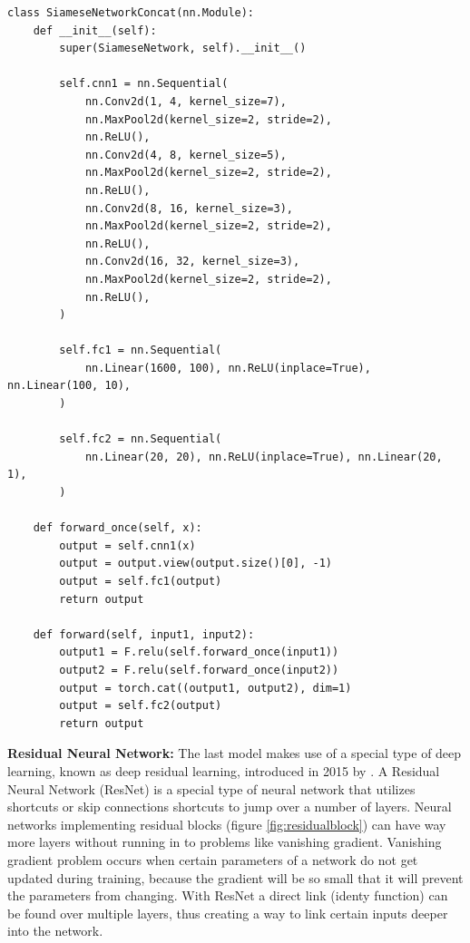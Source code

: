  \begin{lstlisting}[caption={Code for CNN with Cross Entropy Loss}, label={lst:cnncel}, frame=single, breaklines=true]
 class SiameseNetworkConcat(nn.Module):
    def __init__(self):
        super(SiameseNetwork, self).__init__()

        self.cnn1 = nn.Sequential(
            nn.Conv2d(1, 4, kernel_size=7),
            nn.MaxPool2d(kernel_size=2, stride=2),
            nn.ReLU(),
            nn.Conv2d(4, 8, kernel_size=5),
            nn.MaxPool2d(kernel_size=2, stride=2),
            nn.ReLU(),
            nn.Conv2d(8, 16, kernel_size=3),
            nn.MaxPool2d(kernel_size=2, stride=2),
            nn.ReLU(),
            nn.Conv2d(16, 32, kernel_size=3),
            nn.MaxPool2d(kernel_size=2, stride=2),
            nn.ReLU(),
        )

        self.fc1 = nn.Sequential(
            nn.Linear(1600, 100), nn.ReLU(inplace=True), nn.Linear(100, 10),
        )

        self.fc2 = nn.Sequential(
            nn.Linear(20, 20), nn.ReLU(inplace=True), nn.Linear(20, 1),
        )

    def forward_once(self, x):
        output = self.cnn1(x)
        output = output.view(output.size()[0], -1)
        output = self.fc1(output)
        return output

    def forward(self, input1, input2):
        output1 = F.relu(self.forward_once(input1))
        output2 = F.relu(self.forward_once(input2))
        output = torch.cat((output1, output2), dim=1)
        output = self.fc2(output)
        return output
 \end{lstlisting}

\textbf{Residual Neural Network:} The last model makes use of a special type of deep learning, known as deep residual learning, introduced in 2015 by \cite{he2016deep}. A Residual Neural Network (ResNet) is a special type of neural network that utilizes shortcuts or skip connections shortcuts to jump over a number of layers. Neural networks implementing residual blocks (figure \ref{fig:residualblock}) can have way more layers without running in to problems like vanishing gradient. Vanishing gradient problem occurs when certain parameters of a network do not get updated during training, because the gradient will be so small that it will prevent the parameters from changing. With ResNet a direct link (identy function) can be found over multiple layers, thus creating a way to link certain inputs deeper into the network.

